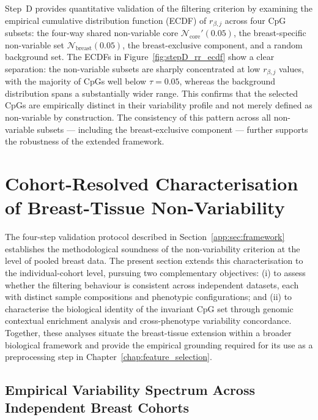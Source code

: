 Step~D provides quantitative validation of the filtering 
criterion by examining the empirical cumulative distribution 
function (ECDF) of $r_{\beta,j}$ across four CpG subsets: 
the four-way shared non-variable core 
$\mathcal{N}_{\mathrm{core}}'(0.05)$, the breast-specific 
non-variable set $\mathcal{N}_{\mathrm{breast}}(0.05)$, 
the breast-exclusive component, and a random background set.
The ECDFs in Figure~\ref{fig:stepD_rr_ecdf} show a 
clear separation: the non-variable subsets are sharply 
concentrated at low $r_{\beta,j}$ values, with the 
majority of CpGs well below $\tau = 0.05$, whereas 
the background distribution spans a substantially 
wider range. This confirms that the selected CpGs 
are empirically distinct in their variability profile 
and not merely defined as non-variable by construction. 
The consistency of this pattern across all non-variable 
subsets — including the breast-exclusive component — 
further supports the robustness of the extended 
framework.

\section{Cohort-Resolved Characterisation of Breast-Tissue Non-Variability}
\label{app:sec:dataset_specific}
The four-step validation protocol described in 
Section~\ref{app:sec:framework} establishes the methodological 
soundness of the non-variability criterion at the level of 
pooled breast data. The present section extends this 
characterisation to the individual-cohort level, pursuing two 
complementary objectives: (i) to assess whether the filtering 
behaviour is consistent across independent datasets, each with 
distinct sample compositions and phenotypic configurations; and 
(ii) to characterise the biological identity of the invariant CpG 
set through genomic contextual enrichment analysis and 
cross-phenotype variability concordance. Together, these analyses 
situate the breast-tissue extension within a broader biological 
framework and provide the empirical grounding required for its 
use as a preprocessing step in 
Chapter~\ref{chap:feature_selection}.

\subsection{Empirical Variability Spectrum Across Independent Breast Cohorts}
\label{app:sec:empirical_variability_spectrum}

